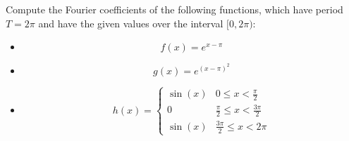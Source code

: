 \documentclass[11pt]{article}
\begin{document}
\begin{exercise}
    Compute the Fourier coefficients of the following functions, which have period $T = 2\pi$ and have the given values over the interval $[0,2\pi)$:
    \begin{itemize}
     \item 
     \[
        f(x) = e^{x - \pi}
     \]
     \item 
     \[
        g(x) = e^{(x - \pi)^2}
     \]
     \item 
     \[
        h(x) = \left\{\begin{array}{ll}
            \sin(x) & 0 \leq x < \frac \pi 2
            \\
            0   & \frac \pi 2 \leq x < \frac{3\pi}{2} 
            \\
            \sin(x) & \frac {3\pi} 2 \leq x < 2\pi
        \end{array}\right.
     \]
    \end{itemize}
\end{exercise}
\end{document}
